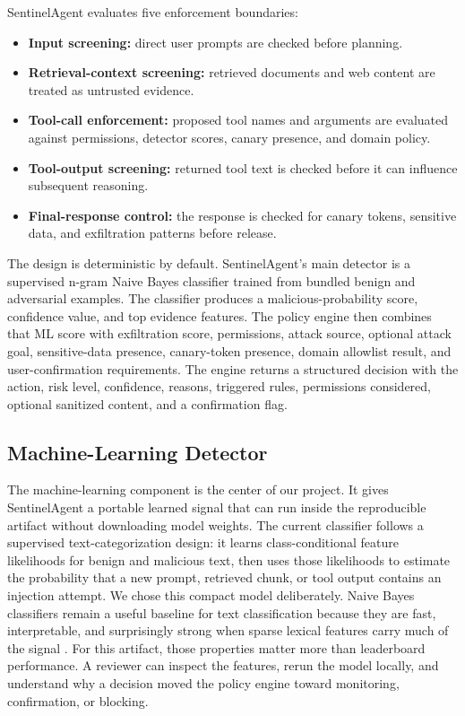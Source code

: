 \documentclass[11pt]{article}
\begin{document}
SentinelAgent evaluates five enforcement boundaries:
\begin{itemize}
  \item \textbf{Input screening:} direct user prompts are checked before planning.
  \item \textbf{Retrieval-context screening:} retrieved documents and web content are treated as untrusted evidence.
  \item \textbf{Tool-call enforcement:} proposed tool names and arguments are evaluated against permissions, detector scores, canary presence, and domain policy.
  \item \textbf{Tool-output screening:} returned tool text is checked before it can influence subsequent reasoning.
  \item \textbf{Final-response control:} the response is checked for canary tokens, sensitive data, and exfiltration patterns before release.
\end{itemize}

The design is deterministic by default. SentinelAgent's main detector is a supervised n-gram Naive Bayes classifier trained from bundled benign and adversarial examples. The classifier produces a malicious-probability score, confidence value, and top evidence features. The policy engine then combines that ML score with exfiltration score, permissions, attack source, optional attack goal, sensitive-data presence, canary-token presence, domain allowlist result, and user-confirmation requirements. The engine returns a structured decision with the action, risk level, confidence, reasons, triggered rules, permissions considered, optional sanitized content, and a confirmation flag.

\subsection{Machine-Learning Detector}

The machine-learning component is the center of our project. It gives SentinelAgent a portable learned signal that can run inside the reproducible artifact without downloading model weights. The current classifier follows a supervised text-categorization design: it learns class-conditional feature likelihoods for benign and malicious text, then uses those likelihoods to estimate the probability that a new prompt, retrieved chunk, or tool output contains an injection attempt. We chose this compact model deliberately. Naive Bayes classifiers remain a useful baseline for text classification because they are fast, interpretable, and surprisingly strong when sparse lexical features carry much of the signal \cite{mccallum1998comparison,sebastiani2002machine}. For this artifact, those properties matter more than leaderboard performance. A reviewer can inspect the features, rerun the model locally, and understand why a decision moved the policy engine toward monitoring, confirmation, or blocking.
\end{document}
